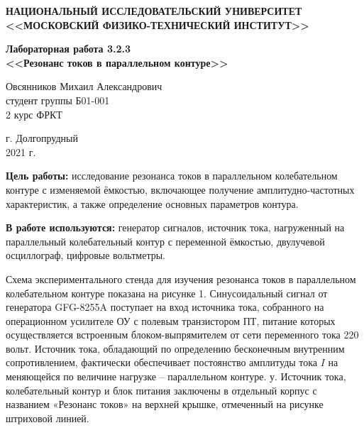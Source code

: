 \documentclass[a4paper,12pt]{article} %
\begin{document}
	
	
	\begin{center}
		
		
		\textbf{НАЦИОНАЛЬНЫЙ ИССЛЕДОВАТЕЛЬСКИЙ УНИВЕРСИТЕТ \\ <<МОСКОВСКИЙ ФИЗИКО-ТЕХНИЧЕСКИЙ ИНСТИТУТ>>}
		\vspace{13ex}
		
		\textbf{Лабораторная работа 3.2.3\\ <<Резонанс токов в параллельном контуре>>}
		\vspace{40ex}
		
		\normalsize{Овсянников Михаил Александрович \\ студент группы Б01-001\\ 2 курс ФРКТ\\}
	\end{center}
	
	\vfill 
	
	\begin{center}
		г. Долгопрудный\\ 
		2021 г.
	\end{center}
	
	
	\thispagestyle{empty} %
	\newpage
	
	\setcounter{page}{12}
	
	\textbf{Цель работы:} исследование резонанса токов в параллельном колебательном контуре с изменяемой ёмкостью, включающее получение амплитудно-частотных характеристик, а также определение основных параметров контура.
	
	
	\textbf{В работе используются:} генератор сигналов, источник тока, нагруженный на параллельный колебательный контур с переменной ёмкостью, двулучевой осциллограф, цифровые вольтметры.
	
	
	Схема экспериментального стенда для изучения резонанса токов в параллельном колебательном контуре показана на рисунке 1. Синусоидальный сигнал от генератора GFG-8255A поступает на вход источника тока, собранного на операционном усилителе ОУ с полевым транзистором ПТ, питание которых осуществляется встроенным блоком-выпрямителем от сети переменного тока 220 вольт. Источник тока, обладающий по определению бесконечным внутренним сопротивлением, фактически обеспечивает постоянство амплитуды тока $I$ на меняющейся по величине нагрузке – параллельном контуре. у. Источник тока, колебательный контур и блок питания заключены в отдельный корпус с названием «Резонанс токов» на верхней крышке, отмеченный на рисунке штриховой линией.
\end{document}
